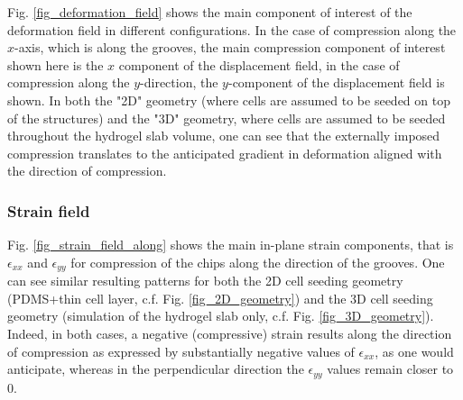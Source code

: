 \documentclass[11pt]{amsart}
\begin{document}
Fig. \ref{fig_deformation_field} shows the main component of interest of the deformation field in different configurations. In the case of compression along the $x$-axis, which is along the grooves, the main compression component of interest shown here is the $x$ component of the displacement field, in the case of compression along the $y$-direction, the $y$-component of the displacement field is shown. In both the "2D" geometry (where cells are assumed to be seeded on top of the structures) and the "3D" geometry, where cells are assumed to be seeded throughout the hydrogel slab volume, one can see that the externally imposed compression translates to the anticipated gradient in deformation aligned with the direction of compression.


\begin{figure}
\end{figure}

\subsubsection{Strain field}




Fig. \ref{fig_strain_field_along} shows the main in-plane strain components, that is $\epsilon_{xx}$ and $\epsilon_{yy}$ for compression of the chips along the direction of the grooves. One can see similar resulting patterns for both the 2D cell seeding geometry (PDMS+thin cell layer, c.f. Fig. \ref{fig_2D_geometry}) and the 3D cell seeding geometry (simulation of the hydrogel slab only, c.f. Fig. \ref{fig_3D_geometry}). Indeed, in both cases, a negative (compressive) strain results along the direction of compression as expressed by substantially negative values of $\epsilon_{xx}$, as one would anticipate, whereas in the perpendicular direction the $\epsilon_{yy}$ values remain closer to 0. 
\end{document}
